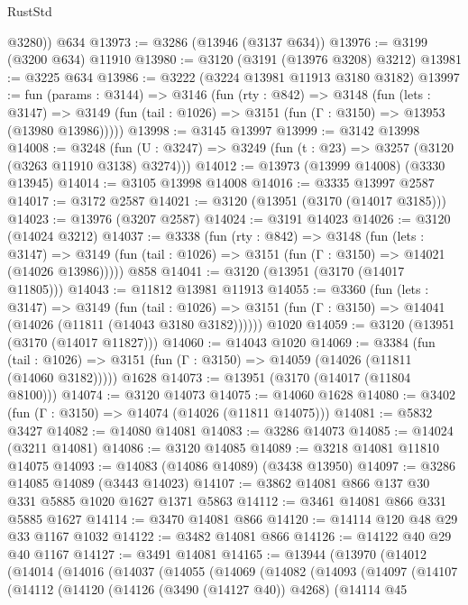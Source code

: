 \begin{lexlean}{RustStd}
\begin{coremodule}
        @3280))
    @634
@13973 := @3286 (@13946 (@3137 @634))
@13976 := @3199 (@3200 @634) @11910
@13980 := @3120 (@3191 (@13976 @3208) @3212)
@13981 := @3225 @634
@13986 := @3222 (@3224 @13981 @11913 @3180 @3182)
@13997 := fun (params : @3144) =>
  @3146
    (fun (rty : @842) =>
    @3148
      (fun (lets : @3147) =>
      @3149 (fun (tail : @1026) => @3151 (fun (Γ : @3150) => @13953 (@13980 @13986)))))
@13998 := @3145 @13997
@13999 := @3142 @13998
@14008 := @3248
    (fun (U : @3247) => @3249 (fun (t : @23) => @3257 (@3120 (@3263 @11910 @3138) @3274)))
@14012 := @13973 (@13999 @14008) (@3330 @13945)
@14014 := @3105 @13998 @14008
@14016 := @3335 @13997 @2587
@14017 := @3172 @2587
@14021 := @3120 (@13951 (@3170 (@14017 @3185)))
@14023 := @13976 (@3207 @2587)
@14024 := @3191 @14023
@14026 := @3120 (@14024 @3212)
@14037 := @3338
    (fun (rty : @842) =>
    @3148
      (fun (lets : @3147) =>
      @3149 (fun (tail : @1026) => @3151 (fun (Γ : @3150) => @14021 (@14026 @13986)))))
    @858
@14041 := @3120 (@13951 (@3170 (@14017 @11805)))
@14043 := @11812 @13981 @11913
@14055 := @3360
    (fun (lets : @3147) =>
    @3149
      (fun (tail : @1026) =>
      @3151 (fun (Γ : @3150) => @14041 (@14026 (@11811 (@14043 @3180 @3182))))))
    @1020
@14059 := @3120 (@13951 (@3170 (@14017 @11827)))
@14060 := @14043 @1020
@14069 := @3384
    (fun (tail : @1026) => @3151 (fun (Γ : @3150) => @14059 (@14026 (@11811 (@14060 @3182)))))
    @1628
@14073 := @13951 (@3170 (@14017 (@11804 @8100)))
@14074 := @3120 @14073
@14075 := @14060 @1628
@14080 := @3402 (fun (Γ : @3150) => @14074 (@14026 (@11811 @14075)))
@14081 := @5832 @3427
@14082 := @14080 @14081
@14083 := @3286 @14073
@14085 := @14024 (@3211 @14081)
@14086 := @3120 @14085
@14089 := @3218 @14081 @11810 @14075
@14093 := @14083 (@14086 @14089) (@3438 @13950)
@14097 := @3286 @14085 @14089 (@3443 @14023)
@14107 := @3862 @14081 @866 @137 @30 @331 @5885 @1020 @1627 @1371 @5863
@14112 := @3461 @14081 @866 @331 @5885 @1627
@14114 := @3470 @14081 @866
@14120 := @14114 @120 @48 @29 @33 @1167 @1032
@14122 := @3482 @14081 @866
@14126 := @14122 @40 @29 @40 @1167
@14127 := @3491 @14081
@14165 := @13944
    (@13970
      (@14012
        (@14014
          (@14016
            (@14037
              (@14055
                (@14069
                  (@14082
                    (@14093
                      (@14097
                        (@14107
                          (@14112
                            (@14120
                              (@14126 (@3490 (@14127 @40)) @4268)
                              (@14114
                                @45

\end{coremodule}
\end{lexlean}
